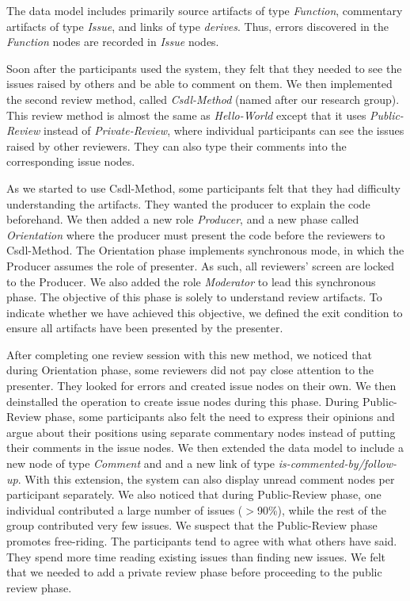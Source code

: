 The data model includes primarily
source artifacts of type {\it Function}, commentary artifacts of
type {\it Issue}, and links of type {\it derives}.
Thus, errors discovered in the {\it Function} nodes are recorded in
{\it Issue} nodes. 

Soon after the participants used the system, they
felt that they needed to see
the issues raised by others and be able to comment on them. We then
implemented the 
second review method, called {\it Csdl-Method} (named after our
research group). This review method is almost the same as {\it
Hello-World} except that it uses {\it Public-Review} instead of {\it
Private-Review}, where
individual participants can see the issues raised by other
reviewers. They can also type their comments into the corresponding 
issue nodes. 

As we started to use Csdl-Method,
some participants felt that they had difficulty understanding the
artifacts. They wanted the producer to explain the code beforehand.
We then added a new role  {\it Producer}, and a new 
phase called {\it Orientation} where the producer must present the
code before the reviewers to Csdl-Method.
The Orientation phase implements synchronous
mode, in which the Producer assumes the role of presenter. As such, all
reviewers' screen are locked to the Producer. We also added the role
{\it Moderator} to lead this synchronous phase.
The objective of this phase is solely to understand review
artifacts. To indicate whether we have achieved this objective,
we defined the exit condition to ensure all artifacts have been 
presented by the presenter.

After completing one review session with this new method, we noticed
that during Orientation 
phase, some reviewers did not pay close attention to the
presenter. They looked for errors and created issue nodes on their own.
We then deinstalled the operation to create issue nodes during this
phase. 
During Public-Review phase, some participants also felt the need to
express their opinions and argue about their 
positions using separate commentary nodes instead of putting their
comments in the issue nodes. 
We then extended the data model to include a new node of type {\it
Comment} and  and a new link of type {\it is-commented-by/follow-up}. 
With this extension, the system can also display
unread comment nodes per participant separately.
We also noticed that during Public-Review phase, one
individual contributed a large number of issues ($>$90\%), while the
rest of the group contributed very few issues. We suspect that the
Public-Review phase promotes free-riding. The participants tend to
agree with what others have said. They spend more time reading
existing issues than finding new issues. We felt
that we needed to add a private review phase before proceeding to the
public review phase. 

